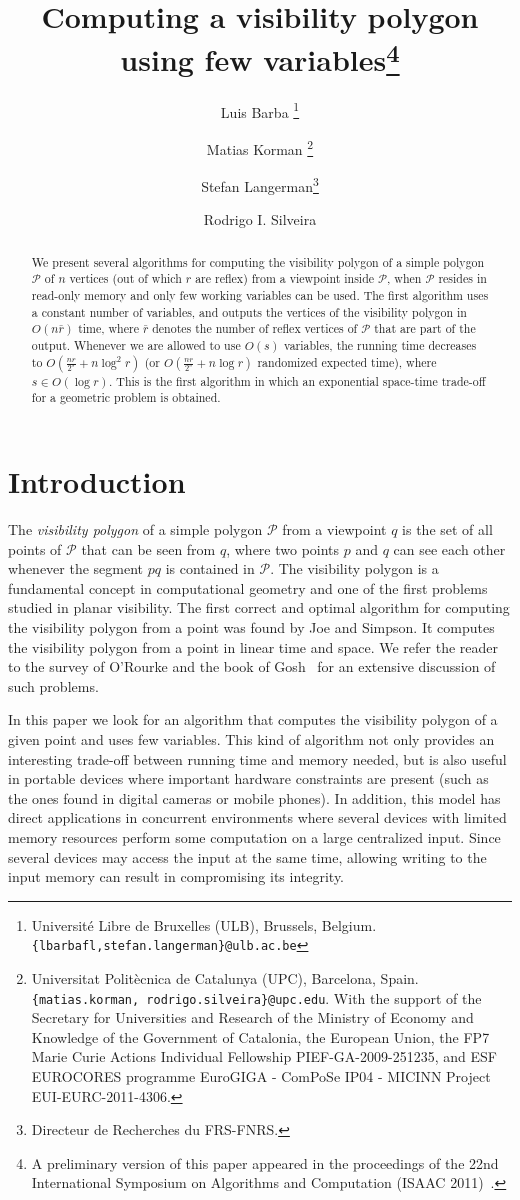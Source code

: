 \documentclass[a4paper]{article}
\title{Computing a visibility polygon using few variables\thanks{A preliminary version of this paper appeared in the proceedings of the 22nd International Symposium on Algorithms and Computation (ISAAC 2011)~\cite{bkls-cvpufv-11}.}}
\author{
Luis Barba
\thanks{Universit\'e Libre de Bruxelles (ULB), Brussels, Belgium. {\tt \{lbarbafl,stefan.langerman\}@ulb.ac.be}}
\and Matias Korman
\thanks{Universitat Polit\`{e}cnica de Catalunya (UPC), Barcelona, Spain. {\tt  \{matias.korman, rodrigo.silveira\}@upc.edu}. With the support of the Secretary for Universities and Research of the Ministry of Economy and Knowledge of the Government of Catalonia, the European Union, the FP7 Marie Curie Actions Individual Fellowship PIEF-GA-2009-251235, and ESF EUROCORES programme EuroGIGA - ComPoSe IP04 - MICINN Project EUI-EURC-2011-4306.}
\and Stefan Langerman\footnotemark[2]
\thanks{Directeur de Recherches du FRS-FNRS.}
\and Rodrigo I. Silveira\footnotemark[3]
}
\date{}
\newcommand{\Poly}{\ensuremath{\mathcal{P}}}               \newcommand{\bd}{\ensuremath{\partial \Poly} }                 \newcommand{\Vis}{\ensuremath{\mathrm{Vis}_\Poly}} \newcommand{\VisC}{\ensuremath{\mathrm{Vis}_{\mathcal{C}}}} \newcommand{\VisCprime}{\ensuremath{\mathrm{Vis}_{\mathcal{C'}}}} \newcommand{\E}{\ensuremath{\mathrm{E}}}                    \newcommand{\Rin}{\ensuremath{r}}      \newcommand{\Rout}{\ensuremath{\bar{r}}}      \newcommand{\Hout}{\ensuremath{\bar{h}}}      \newcommand{\chain}{\ensuremath{{\mathrm{Chain}}}}     \newcommand{\region}{\ensuremath{{{\mathcal R}}}}
\begin{document}
\maketitle

\begin{abstract}
We present several algorithms for computing the visibility polygon of a simple polygon $\Poly$ of $n$ vertices (out of which $r$ are reflex) from a viewpoint inside $\Poly$, when $\Poly$ resides in read-only memory and only few working variables can be used.
The first algorithm uses a constant number of variables, and outputs the vertices of the visibility polygon in $O(n\Rout)$ time, where $\Rout$ denotes the number of reflex vertices of $\Poly$ that are part of the output. Whenever we are allowed to use $O(s)$ variables, the running time decreases to $O(\frac{nr}{2^{s}}+n\log^2 r)$ (or $O(\frac{nr}{2^{s}}+n\log r)$ randomized expected time), where $s\in O(\log r)$. This is the first algorithm in which an exponential space-time trade-off for a geometric problem is obtained.
\end{abstract}   


\section{Introduction}


The \emph{visibility polygon} of a simple polygon $\Poly$ from a viewpoint $q$ is the set of all points of $\Poly$ that can be seen from $q$, where two points $p$ and $q$ can see each other whenever the segment $pq$ is contained in $\Poly$.
The visibility polygon is a fundamental concept in computational geometry and one of the first problems studied in planar visibility. 
The first correct and optimal algorithm for computing the visibility polygon from a point was found by  Joe and Simpson\cite{js-clvpa-87}. It computes the visibility polygon from a point in linear time and space. 
We refer the reader to the survey of O'Rourke \cite{r-v-04} and the book of Gosh~\cite{g-vap-07} for an extensive discussion of such problems.





In this paper we look for an algorithm that computes the visibility polygon of a given point and uses few variables. This kind of algorithm not only provides an interesting trade-off between running time and memory needed, but is also useful in portable devices where important hardware constraints are present (such as the ones found in digital cameras or mobile phones). 
In addition, this model has direct applications in concurrent environments where several devices with limited memory resources perform some computation on a large centralized input. 
Since several devices may access the input at the same time, allowing writing to the input memory can result in compromising its integrity.
\end{document}
